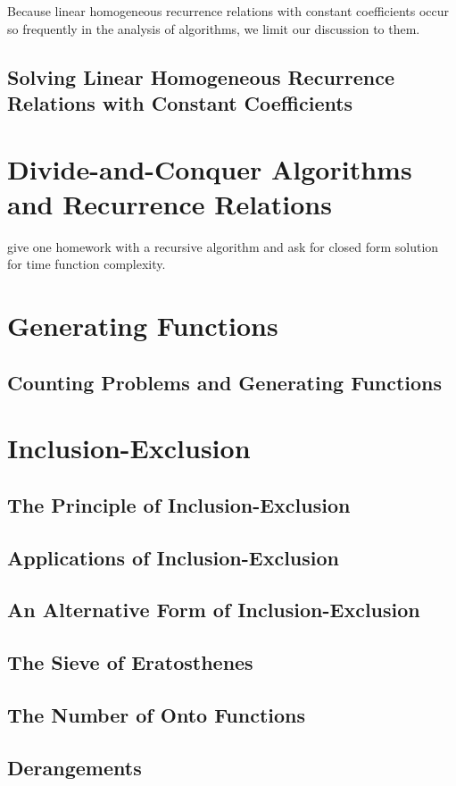 \documentclass[11pt]{book} %
\theoremstyle {definition}
\theoremstyle {remark}
\begin{document}
Because linear homogeneous recurrence relations with constant coefficients occur so frequently in the analysis of algorithms, we limit our discussion to them.

  \subsection {Solving Linear Homogeneous Recurrence Relations with Constant Coefficients}

\section {Divide-and-Conquer Algorithms and Recurrence Relations}
give one homework with a recursive algorithm and ask for closed form solution for time function complexity.

\section {Generating Functions}
    \subsection {Counting Problems and Generating Functions}

\section {Inclusion-Exclusion}
  \subsection{The Principle of Inclusion-Exclusion}
  \subsection{Applications of Inclusion-Exclusion}
  \subsection{An Alternative Form of Inclusion-Exclusion}
  \subsection{The Sieve of Eratosthenes}
  \subsection{The Number of Onto Functions}
  \subsection{Derangements}
\end{document}
